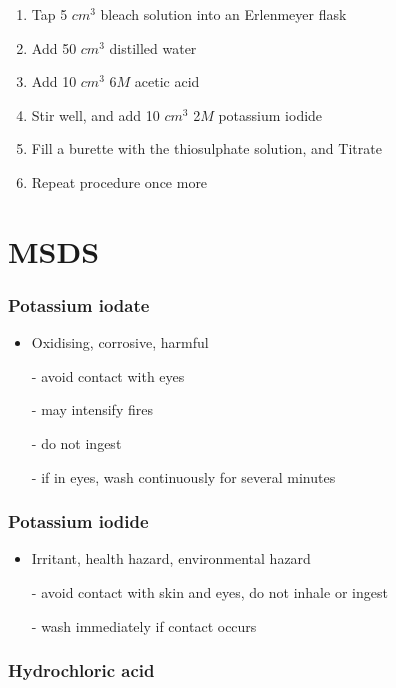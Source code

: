 \documentclass[a4paper, british]{article}
\begin{document}
\begin{appendices}
\begin{enumerate}
    \item Tap 5 \(cm^3\) bleach solution into an Erlenmeyer flask
    \item Add 50 \(cm^3\) distilled water
    \item Add 10 \(cm^3\) 6\(M\) acetic acid
    \item Stir well, and add 10 \(cm^3\) 2\(M\) potassium iodide
    \item Fill a burette with the thiosulphate solution, and Titrate
    \item Repeat procedure once more
\end{enumerate}

\newpage

\section{MSDS}

\subsubsection*{Potassium iodate}

\begin{itemize}
    \item Oxidising, corrosive, harmful
    \item[-] avoid contact with eyes
    \item[-] may intensify fires
    \item[-] do not ingest 
    \item[-] if in eyes, wash continuously for several minutes
\end{itemize}

\subsubsection*{Potassium iodide}

\begin{itemize}
    \item Irritant, health hazard, environmental hazard
    \item[-] avoid contact with skin and eyes, do not inhale or ingest
    \item[-] wash immediately if contact occurs
\end{itemize}

\subsubsection*{Hydrochloric acid}


\end{appendices}
\end{document}
